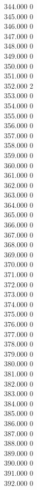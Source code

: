 { 344.000	0 \\
 345.000	0 \\
 346.000	0 \\
 347.000	0 \\
 348.000	0 \\
 349.000	0 \\
 350.000	0 \\
 351.000	0 \\
 352.000	2 \\
 353.000	0 \\
 354.000	0 \\
 355.000	0 \\
 356.000	0 \\
 357.000	0 \\
 358.000	0 \\
 359.000	0 \\
 360.000	0 \\
 361.000	0 \\
 362.000	0 \\
 363.000	0 \\
 364.000	0 \\
 365.000	0 \\
 366.000	0 \\
 367.000	0 \\
 368.000	0 \\
 369.000	0 \\
 370.000	0 \\
 371.000	0 \\
 372.000	0 \\
 373.000	0 \\
 374.000	0 \\
 375.000	0 \\
 376.000	0 \\
 377.000	0 \\
 378.000	0 \\
 379.000	0 \\
 380.000	0 \\
 381.000	0 \\
 382.000	0 \\
 383.000	0 \\
 384.000	0 \\
 385.000	0 \\
 386.000	0 \\
 387.000	0 \\
 388.000	0 \\
 389.000	0 \\
 390.000	0 \\
 391.000	0 \\
 392.000	0 \\
}
